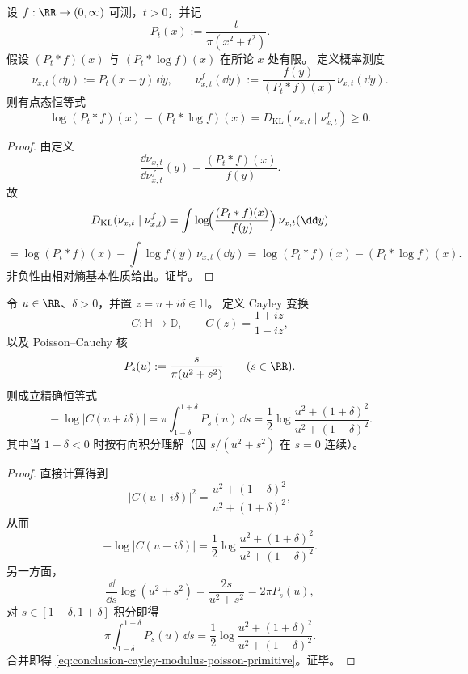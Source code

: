 \begin{proposition}\label{prop:conclusion-poisson-jensen-gap-reversekl}
设 \(f:\RR\to(0,\infty)\) 可测，\(t>0\)，并记
\[
P_t(x):=\frac{t}{\pi(x^2+t^2)}.
\]
假设 \((P_t*f)(x)\) 与 \((P_t*\log f)(x)\) 在所论 \(x\) 处有限。
定义概率测度
\[
\nu_{x,t}(\dd y):=P_t(x-y)\,\dd y,
\qquad
\nu_{x,t}^{f}(\dd y):=\frac{f(y)}{(P_t*f)(x)}\,\nu_{x,t}(\dd y).
\]
则有点态恒等式
\begin{equation}\label{eq:conclusion-poisson-jensen-gap-reversekl}
\boxed{\;
\log(P_t*f)(x)-(P_t*\log f)(x)
=D_{\mathrm{KL}}(\nu_{x,t}\mid \nu_{x,t}^{f})\ge 0.\;}
\end{equation}
\end{proposition}
\begin{proof}
由定义
\[
\frac{\dd\nu_{x,t}}{\dd\nu_{x,t}^{f}}(y)=\frac{(P_t*f)(x)}{f(y)}.
\]
故
\[
D_{\mathrm{KL}}(\nu_{x,t}\mid \nu_{x,t}^{f})
=\int \log\!\Bigl(\frac{(P_t*f)(x)}{f(y)}\Bigr)\,\nu_{x,t}(\dd y)
\]
\[
=\log(P_t*f)(x)-\int \log f(y)\,\nu_{x,t}(\dd y)
=\log(P_t*f)(x)-(P_t*\log f)(x).
\]
非负性由相对熵基本性质给出。证毕。
\end{proof}

\begin{proposition}\label{prop:conclusion-cayley-modulus-poisson-primitive}
令 \(u\in\RR\)、\(\delta>0\)，并置 \(z=u+i\delta\in\mathbb H\)。
定义 Cayley 变换
\[
C:\mathbb H\to\mathbb D,\qquad C(z)=\frac{1+iz}{1-iz},
\]
以及 Poisson--Cauchy 核
\[
P_s(u):=\frac{s}{\pi(u^2+s^2)}\qquad(s\in\RR).
\]
则成立精确恒等式
\begin{equation}\label{eq:conclusion-cayley-modulus-poisson-primitive}
\boxed{\;
-\log|C(u+i\delta)|
=\pi\int_{1-\delta}^{1+\delta}P_s(u)\,\dd s
=\frac12\log\frac{u^2+(1+\delta)^2}{u^2+(1-\delta)^2}.\;}
\end{equation}
其中当 \(1-\delta<0\) 时按有向积分理解（因 \(s/(u^2+s^2)\) 在 \(s=0\) 连续）。
\end{proposition}
\begin{proof}
直接计算得到
\[
|C(u+i\delta)|^2=\frac{u^2+(1-\delta)^2}{u^2+(1+\delta)^2},
\]
从而
\[
-\log|C(u+i\delta)|
=\frac12\log\frac{u^2+(1+\delta)^2}{u^2+(1-\delta)^2}.
\]
另一方面，
\[
\frac{\dd}{\dd s}\log(u^2+s^2)=\frac{2s}{u^2+s^2}=2\pi P_s(u),
\]
对 \(s\in[1-\delta,1+\delta]\) 积分即得
\[
\pi\int_{1-\delta}^{1+\delta}P_s(u)\,\dd s
=\frac12\log\frac{u^2+(1+\delta)^2}{u^2+(1-\delta)^2}.
\]
合并即得 \eqref{eq:conclusion-cayley-modulus-poisson-primitive}。证毕。
\end{proof}

